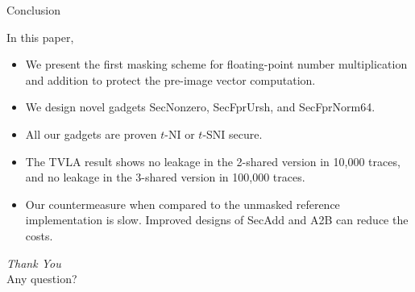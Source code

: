 \begin{frame}{Conclusion}

In this paper,
\pause
\begin{itemize}
	\item We present the first masking scheme for floating-point number multiplication and addition to protect the pre-image vector computation.
	\pause
	\item We design novel gadgets {\sf SecNonzero}, {\sf SecFprUrsh}, and {\sf SecFprNorm64}.
	\pause
	\item All our gadgets are proven $t$-NI or $t$-SNI secure.
	\pause
	\item The TVLA result shows no leakage in the 2-shared version in 10,000 traces, and no leakage in the 3-shared version in 100,000 traces.
	\pause
	\item Our countermeasure when compared to the unmasked reference implementation is slow. Improved designs of {\sf SecAdd} and {\sf A2B} can reduce the costs.
\end{itemize}


\end{frame}


\begin{frame}

  \centering \Huge
  \emph{Thank You} \\
  \vspace{15pt}
  \Large
  Any question?

\end{frame} 